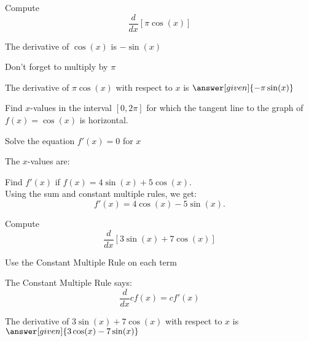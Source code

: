 \documentclass{ximera}
\begin{document}
\begin{problem} %
  Compute 
  \[
  \frac{d}{dx} \left[\pi\cos(x)\right]
  \]
  
    \begin{hint}
      The derivative of $\cos(x)$ is $-\sin(x)$
    \end{hint}
		\begin{hint}
		  Don't forget to multiply by $\pi$
		\end{hint}
		
		The derivative of $\pi\cos(x)$ with respect to $x$ is
		 $\answer[given]{-\pi\sin(x)}$
	
\end{problem}



\begin{problem} %

Find $x$-values in the interval $[0, 2\pi]$ for which the tangent line to the graph of $f(x) = \cos(x)$ is horizontal.


\begin{hint}
Solve the equation $f'(x) = 0$ for $x$
\end{hint}

The $x$-values are:
\begin{multipleChoice}
  \choice{$-\pi,0 \pi$}
\end{multipleChoice}

\end{problem}



\begin{center}
\begin{foldable}
\end{foldable}
\end{center}


\begin{example} %
 Find $f'(x)$ if $f(x) = 4\sin(x) + 5\cos(x).$ \\
 Using the sum and constant multiple rules, we get: 
\[
f'(x) = 4\cos(x) - 5\sin(x).
\]
\end{example}


\begin{problem} %
  Compute 
  \[
  \frac{d}{dx} \left[3\sin(x) + 7\cos(x)\right]
  \]
  
		\begin{hint}
      Use the Constant Multiple Rule on each term
    \end{hint}
    \begin{hint}
      The Constant Multiple Rule says:
      \[
      \frac{d}{dx} cf(x) = cf'(x)
      \]
    \end{hint}    
		The derivative of $3\sin(x) + 7\cos(x)$ with respect to $x$ is
		 $\answer[given]{3\cos(x) - 7\sin(x)}$
	
\end{problem}
\end{document}
